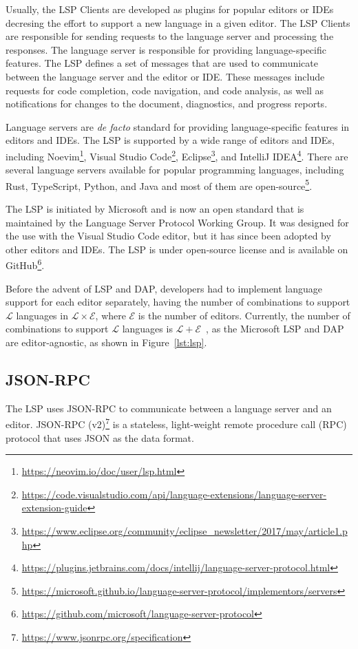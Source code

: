 Usually, the LSP Clients are developed as plugins for popular editors or IDEs decresing the effort to support a new language in a given editor. The LSP Clients are responsible for sending requests to the language server and processing the responses. The language server is responsible for providing language-specific features. The LSP defines a set of messages that are used to communicate between the language server and the editor or IDE. These messages include requests for code completion, code navigation, and code analysis, as well as notifications for changes to the document, diagnostics, and progress reports.

Language servers are \textit{de facto} standard for providing language-specific features in editors and IDEs. The LSP is supported by a wide range of editors and IDEs, including Noevim\footnote{\url{https://neovim.io/doc/user/lsp.html}}, Visual Studio Code\footnote{\url{https://code.visualstudio.com/api/language-extensions/language-server-extension-guide}}, Eclipse\footnote{\url{https://www.eclipse.org/community/eclipse_newsletter/2017/may/article1.php}}, and IntelliJ IDEA\footnote{\url{https://plugins.jetbrains.com/docs/intellij/language-server-protocol.html}}. There are several language servers available for popular programming languages, including Rust, TypeScript, Python, and Java and most of them are open-source\footnote{\url{https://microsoft.github.io/language-server-protocol/implementors/servers}}.

The LSP is initiated by Microsoft and is now an open standard that is maintained by the Language Server Protocol Working Group. It was designed for the use with the Visual Studio Code editor, but it has since been adopted by other editors and IDEs. The LSP is under open-source license and is available on GitHub\footnote{\url{https://github.com/microsoft/language-server-protocol}}.

Before the advent of LSP and DAP, developers had to implement language support for each editor separately, having the number of combinations to support $\mathcal{L}$ languages in $\mathcal{L} \times \mathcal{E}$, where $\mathcal{E}$ is the number of editors. Currently, the number of combinations to support $\mathcal{L}$ languages is $\mathcal{L} + \mathcal{E}$~\cite{Rodriguez-Echeverria18a}, as the Microsoft LSP and DAP are editor-agnostic, as shown in Figure~\ref{lst:lsp}.

\subsection{JSON-RPC}\label{subsec:background:JSONRPC}
The LSP uses JSON-RPC to communicate between a language server and an editor. JSON-RPC (v2)\footnote{\url{https://www.jsonrpc.org/specification}} is a stateless, light-weight remote procedure call (RPC) \cite{Birrell84} protocol that uses JSON as the data format.


